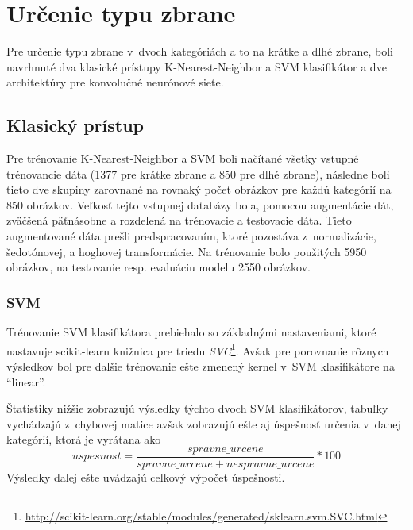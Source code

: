 
\section{Určenie typu zbrane}
Pre určenie typu zbrane v~dvoch kategóriách a to na krátke a dlhé zbrane, boli navrhnuté dva klasické prístupy
    K-Nearest-Neighbor a SVM klasifikátor a dve architektúry pre konvolučné neurónové siete.

\subsection{Klasický prístup}
Pre trénovanie K-Nearest-Neighbor a SVM boli načítané všetky vstupné trénovancie dáta (1377 pre krátke zbrane a 850 pre dlhé zbrane),
    následne boli tieto dve skupiny zarovnané na rovnaký počet obrázkov pre každú kategórií na 850 obrázkov.
Veľkosť tejto vstupnej databázy bola, pomocou augmentácie dát, zväčšená päťnásobne a rozdelená na trénovacie a testovacie dáta.
Tieto augmentované dáta prešli predspracovaním, ktoré pozostáva z~normalizácie, šedotónovej, a hoghovej transformácie.
Na trénovanie bolo použitých 5950 obrázkov, na testovanie resp. evaluáciu modelu 2550 obrázkov.

\subsubsection{SVM}
Trénovanie SVM klasifikátora prebiehalo so základnými nastaveniami, ktoré nastavuje scikit-learn knižnica pre triedu \textit{SVC}\footnote{\url{http://scikit-learn.org/stable/modules/generated/sklearn.svm.SVC.html}}.
Avšak pre porovnanie rôznych výsledkov bol pre dalšie trénovanie ešte zmenený kernel v~SVM klasifikátore na ``linear''.

Štatistiky nižšie zobrazujú výsledky týchto dvoch SVM klasifikátorov, tabuľky vychádzajú z~chybovej matice avšak
    zobrazujú ešte aj úspešnosť určenia v~danej kategórií, ktorá je vyrátana ako
    $$uspesnost = \frac{spravne\_urcene}{spravne\_urcene + nespravne\_urcene} * 100$$
Výsledky ďalej ešte uvádzajú celkový výpočet úspešnosti.

